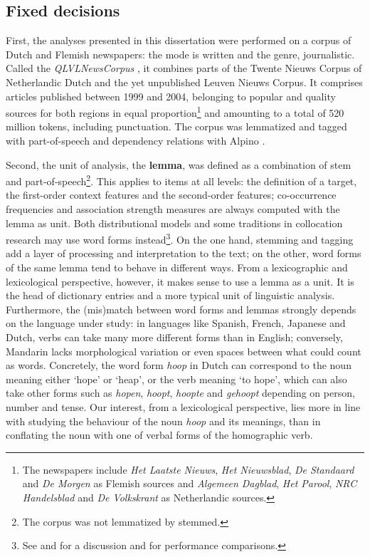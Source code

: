\documentclass[
]{book}
\begin{document}
\hypertarget{corpus}{%
\subsection{Fixed decisions}\label{corpus}}

First, the analyses presented in this dissertation were performed on a corpus of Dutch and Flemish newspapers: the mode is written and the genre, journalistic. Called the \emph{QLVLNewsCorpus} \autocite[30]{depascale_2019}, it combines parts of the Twente Nieuws Corpus of Netherlandic Dutch \autocite{ordelman.etal_2007} and the yet unpublished Leuven Nieuws Corpus. It comprises articles published between 1999 and 2004, belonging to popular and quality sources for both regions in equal proportion\footnote{The newspapers include \emph{Het Laatste Nieuws}, \emph{Het Nieuwsblad}, \emph{De Standaard} and \emph{De Morgen} as Flemish sources and \emph{Algemeen Dagblad}, \emph{Het Parool}, \emph{NRC Handelsblad} and \emph{De Volkskrant} as Netherlandic sources.} and amounting to a total of 520 million tokens, including punctuation. The corpus was lemmatized and tagged with part-of-speech and dependency relations with Alpino \autocite{vannoord_2006}.

Second, the unit of analysis, the \textbf{lemma}, was defined as a combination of stem and part-of-speech\footnote{The corpus was not lemmatized by stemmed.}. This applies to items at all levels: the definition of a target, the first-order context features and the second-order features; co-occurrence frequencies and association strength measures are always computed with the lemma as unit. Both distributional models and some traditions in collocation research may use word forms instead\footnote{See \textcite[155]{turney.pantel_2010} and \textcite[47-48]{sahlgren_2008} for a discussion and \textcite[25]{kiela.clark_2014} for performance comparisons.}. On the one hand, stemming and tagging add a layer of processing and interpretation to the text; on the other, word forms of the same lemma tend to behave in different ways. From a lexicographic and lexicological perspective, however, it makes sense to use a lemma as a unit. It is the head of dictionary entries and a more typical unit of linguistic analysis. Furthermore, the (mis)match between word forms and lemmas strongly depends on the language under study: in languages like Spanish, French, Japanese and Dutch, verbs can take many more different forms than in English; conversely, Mandarin lacks morphological variation or even spaces between what could count as words. Concretely, the word form \emph{hoop} in Dutch can correspond to the noun meaning either `hope' or `heap', or the verb meaning `to hope', which can also take other forms such as \emph{hopen}, \emph{hoopt}, \emph{hoopte} and \emph{gehoopt} depending on person, number and tense. Our interest, from a lexicological perspective, lies more in line with studying the behaviour of the noun \emph{hoop} and its meanings, than in conflating the noun with one of verbal forms of the homographic verb.
\end{document}
